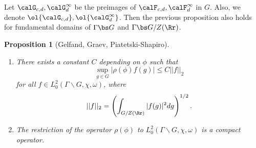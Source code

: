 \documentclass{article}
\newtheorem{proposition}{Proposition}[section]
\begin{document}
Let $\calG_{c, d}, \calG_{d}^{\infty}$ be the preimages of $\calF_{c, d}, \calF_{d}^{\infty}$ in $G$. Also, we denote $\ol{\calG_{c, d}}, \ol{\calG_{d}^{\infty}}$. Then the previous proposition also holds for fundamental domains of $\Gamma \bs G$ and $\Gamma \bs G/Z(\Rr)$. 
\begin{proposition}[Gelfand, Graev, Piatetski-Shapiro]
\label{compact}
\begin{enumerate}
\item There exists a constant $C$ depending on $\phi$ such that 
$$
\sup_{g\in G} |\rho(\phi)f(g)| \leq C||f||_{2}
$$
for all $f\in L_{0}^{2}(\Gamma\backslash G, \chi, \omega)$, where 
$$
||f||_{2} = \left(\int_{G/Z(\Rr)} |f(g)|^{2} dg \right)^{1/2}.
$$
\item The restriction of the operator $\rho(\phi)$ to $L_{0}^{2}(\Gamma\backslash G, \chi, \omega)$ is a compact operator. 
\end{enumerate}
\end{proposition}
\end{document}
